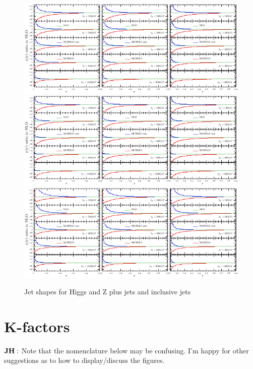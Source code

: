 \documentclass[aps,prd,onecolumn,fleqn,superscriptaddress,groupedaddress,nofootinbib,preprintnumbers,nobalancelastpage]{revtex4}
\begin{document}
\begin{figure}
\includegraphics[width=\textwidth]{plots/shapes/hj/hjshapes-crop.pdf}\\
\includegraphics[width=\textwidth]{plots/shapes/zj/zjshapes-crop.pdf}\\
\includegraphics[width=\textwidth]{plots/shapes/jj/jjshapes-crop.pdf}
\caption{Jet shapes for Higgs and Z plus jets and inclusive jets}
\label{fig:jet_shapes_Higgs_Z_jets}
\end{figure}

\section{K-factors}

$\bf JH:$ Note that the nomenclature below may be confusing. I'm happy for other suggestions as to how to display/discuss the figures. 
\end{document}
